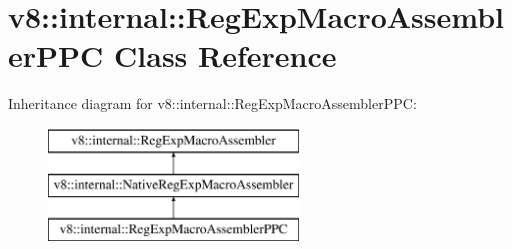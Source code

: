 \hypertarget{classv8_1_1internal_1_1_reg_exp_macro_assembler_p_p_c}{}\section{v8\+:\+:internal\+:\+:Reg\+Exp\+Macro\+Assembler\+P\+PC Class Reference}
\label{classv8_1_1internal_1_1_reg_exp_macro_assembler_p_p_c}
Inheritance diagram for v8\+:\+:internal\+:\+:Reg\+Exp\+Macro\+Assembler\+P\+PC\+:\begin{figure}[H]
\begin{center}
\leavevmode
\includegraphics[height=3.000000cm]{classv8_1_1internal_1_1_reg_exp_macro_assembler_p_p_c}
\end{center}
\end{figure}
